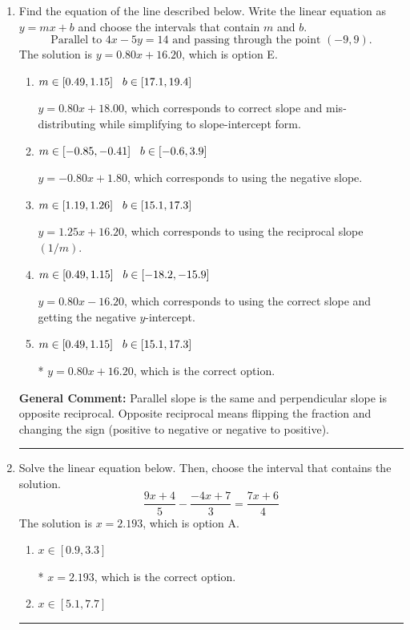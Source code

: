\documentclass{extbook}[14pt]
\newcommand{\litem}[1]{\item #1

\rule{\textwidth}{0.4pt}}
\begin{document}
\begin{enumerate}\litem{
Find the equation of the line described below. Write the linear equation as $ y=mx+b $ and choose the intervals that contain $m$ and $b$.
\[ \text{Parallel to } 4 x - 5 y = 14 \text{ and passing through the point } (-9, 9). \]The solution is \( y = 0.80x + 16.20 \), which is option E.\begin{enumerate}[label=\Alph*.]
\item \( m \in [0.49, 1.15] \hspace*{3mm} b \in [17.1, 19.4] \)

 $y = 0.80x + 18.00$, which corresponds to correct slope and mis-distributing while simplifying to slope-intercept form.
\item \( m \in [-0.85, -0.41] \hspace*{3mm} b \in [-0.6, 3.9] \)

 $y = -0.80x + 1.80$, which corresponds to using the negative slope.
\item \( m \in [1.19, 1.26] \hspace*{3mm} b \in [15.1, 17.3] \)

 $y = 1.25x + 16.20$, which corresponds to using the reciprocal slope $(1/m)$.
\item \( m \in [0.49, 1.15] \hspace*{3mm} b \in [-18.2, -15.9] \)

 $y = 0.80x - 16.20$, which corresponds to using the correct slope and getting the negative $y$-intercept.
\item \( m \in [0.49, 1.15] \hspace*{3mm} b \in [15.1, 17.3] \)

* $y = 0.80x + 16.20$, which is the correct option.
\end{enumerate}

\textbf{General Comment:} Parallel slope is the same and perpendicular slope is opposite reciprocal. Opposite reciprocal means flipping the fraction and changing the sign (positive to negative or negative to positive).
}
\litem{
Solve the linear equation below. Then, choose the interval that contains the solution.
\[ \frac{9x + 4}{5} - \frac{-4x + 7}{3} = \frac{7x + 6}{4} \]The solution is \( x = 2.193 \), which is option A.\begin{enumerate}[label=\Alph*.]
\item \( x \in [0.9, 3.3] \)

* $x = 2.193$, which is the correct option.
\item \( x \in [5.1, 7.7] \)


\end{enumerate}}
\end{enumerate}
\end{document}
